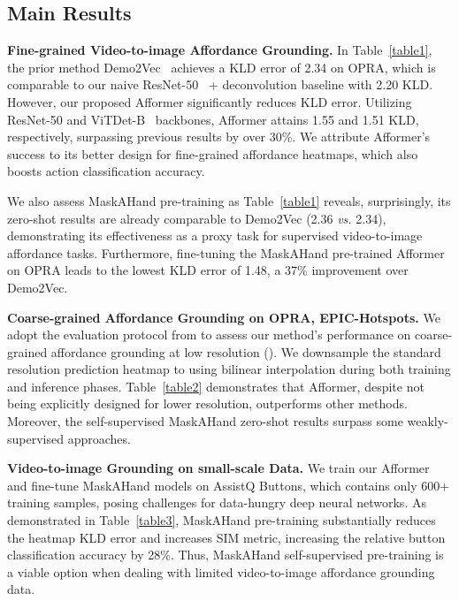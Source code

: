 \documentclass[10pt,twocolumn,letterpaper]{article}
\begin{document}
{\subsection{Main Results}

\noindent\textbf{Fine-grained Video-to-image Affordance Grounding.} 
In Table~\ref{table1}, the prior method Demo2Vec~\cite{demo2vec} achieves a KLD error of 2.34 on OPRA, which is comparable to our naive ResNet-50~\cite{resnet} + deconvolution baseline with 2.20 KLD. However, our proposed Afformer significantly reduces KLD error. Utilizing ResNet-50 and ViTDet-B~\cite{vitdet} backbones, Afformer attains 1.55 and 1.51 KLD, respectively, surpassing previous results by over 30\%. We attribute Afformer's success to its better design for fine-grained affordance heatmaps, which also boosts action classification accuracy.

We also assess MaskAHand pre-training as Table~\ref{table1} reveals, surprisingly, its zero-shot results are already comparable to Demo2Vec (2.36 \textit{vs.} 2.34), demonstrating its effectiveness as a proxy task for supervised video-to-image affordance tasks. Furthermore, fine-tuning the MaskAHand pre-trained Afformer on OPRA leads to the lowest KLD error of 1.48, a 37\% improvement over Demo2Vec.

\noindent\textbf{Coarse-grained Affordance Grounding on OPRA, EPIC-Hotspots.} 
We adopt the evaluation protocol from \cite{hotspot} to assess our method's performance on coarse-grained affordance grounding at low resolution (). We downsample the standard resolution  prediction heatmap to  using bilinear interpolation during both training and inference phases. Table~\ref{table2} demonstrates that Afformer, despite not being explicitly designed for lower resolution, outperforms other methods. Moreover, the self-supervised MaskAHand zero-shot results surpass some weakly-supervised approaches.

\noindent\textbf{Video-to-image Grounding on small-scale Data.} 
We train our Afformer and fine-tune MaskAHand models on AssistQ Buttons, which contains only 600+ training samples, posing challenges for data-hungry deep neural networks. As demonstrated in Table~\ref{table3}, MaskAHand pre-training substantially reduces the heatmap KLD error and increases SIM metric, increasing the relative button classification accuracy by 28\%. Thus, MaskAHand self-supervised pre-training is a viable option when dealing with limited video-to-image affordance grounding data.

}
\end{document}
